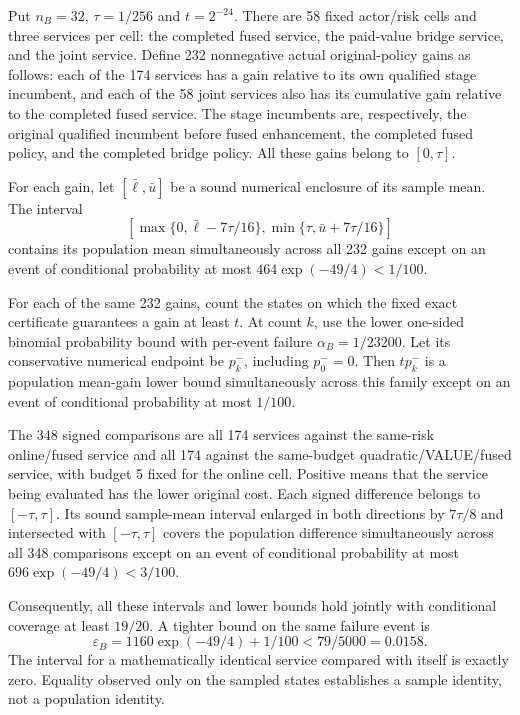 \begin{proposition}
\label{prop:inference124b}
Put $n_B=32$, $\tau=1/256$ and $t=2^{-24}$. There are 58 fixed
actor/risk cells and three services per cell: the completed fused service,
the paid-value bridge service, and the joint service. Define 232
nonnegative actual original-policy gains as follows: each of the 174
services has a gain relative to its own qualified stage incumbent, and
each of the 58 joint services also has its cumulative gain relative to
the completed fused service. The stage incumbents are, respectively,
the original qualified incumbent before fused enhancement, the completed
fused policy, and the completed bridge policy. All these gains belong to
$[0,\tau]$.

For each gain, let $[\bar\ell,\bar u]$ be a sound numerical enclosure
of its sample mean. The interval
\begin{equation}\label{eq:nonnegativeinference124b}
 \left[\max\{0,\bar\ell-7\tau/16\},
       \min\{\tau,\bar u+7\tau/16\}\right]
\end{equation}
contains its population mean simultaneously across all 232 gains except
on an event of conditional probability at most
$464\exp(-49/4)<1/100$.

For each of the same 232 gains, count the states on which the fixed
exact certificate guarantees a gain at least $t$. At count $k$, use
the lower one-sided binomial probability bound with per-event failure
$\alpha_B=1/23200$. Let its conservative numerical endpoint be
$p^-_k$, including $p^-_0=0$. Then $t p^-_k$ is a population mean-gain
lower bound simultaneously across this family except on an event of
conditional probability at most $1/100$.

The 348 signed comparisons are all 174 services against the same-risk
online/fused service and all 174 against the same-budget
quadratic/VALUE/fused service, with budget 5 fixed for the online cell.
Positive means that the service being evaluated has the lower original
cost. Each signed difference belongs to $[-\tau,\tau]$. Its sound
sample-mean interval enlarged in both directions by $7\tau/8$ and
intersected with $[-\tau,\tau]$ covers the population difference
simultaneously across all 348 comparisons except on an event of
conditional probability at most $696\exp(-49/4)<3/100$.

Consequently, all these intervals and lower bounds hold jointly with
conditional coverage at least $19/20$. A tighter bound on the same
failure event is
\begin{equation}\label{eq:actualfailure124b}
 \varepsilon_B=1160\exp(-49/4)+1/100
              <79/5000=0.0158.
\end{equation}
The interval for a mathematically identical service compared with itself
is exactly zero. Equality observed only on the sampled states establishes
a sample identity, not a population identity.
\end{proposition}

